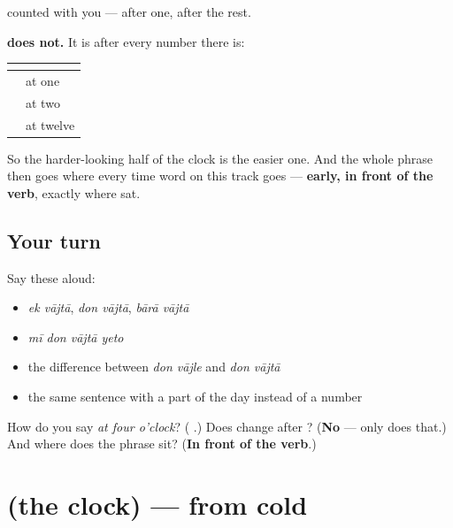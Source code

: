 \begin{grammarlens}[title={Grammar Lens: the one that never moves}]
\textbf{} counted with you — \textbf{} after one, \textbf{} after the rest.

\textbf{ does not.} It is \textbf{} after every number there is:

\noindent
\begin{tabularx}{\linewidth}{@{}>{\raggedright\arraybackslash}X>{\raggedright\arraybackslash}X@{}}
\toprule
\textbf{} & \textbf{} \\
\midrule
\textbf{\mr{एक} \mr{वाजता}} & at one \\
\textbf{\mr{दोन} \mr{वाजता}} & at two \\
\textbf{\mr{बारा} \mr{वाजता}} & at twelve \\
\bottomrule
\end{tabularx}

So the harder-looking half of the clock is the easier one. And the whole phrase then goes where every time word on this track goes — \textbf{early, in front of the verb}, exactly where \textbf{} sat.
\end{grammarlens}

\subsection*{Your turn}
Say these aloud:

\begin{itemize}
\raggedright
  \item \emph{ek vājtā}, \emph{don vājtā}, \emph{bārā vājtā}
  \item \emph{mī don vājtā yeto}
  \item the difference between \emph{don vājle} and \emph{don vājtā}
  \item the same sentence with a part of the day instead of a number
\end{itemize}

\begin{tcolorbox}[breakable,colback=teal!4,colframe=teal!35!black,title={Before you move on}]
How do you say \emph{at four o'clock}? (\emph{\textbf{ }}.) Does \textbf{} change after ? (\textbf{No} — only \textbf{} does that.) And where does the phrase sit? (\textbf{In front of the verb}.)
\end{tcolorbox}
\section[(the clock)]{(the clock) — from cold}

